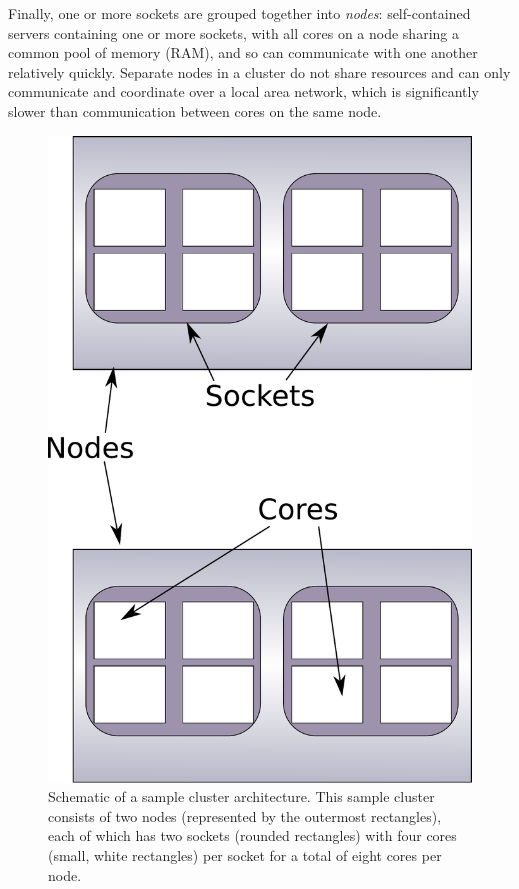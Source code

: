\documentclass{report}
\begin{document}
Finally, one or more sockets are grouped together into \textit{nodes}: self-contained servers containing
one or more sockets, with all cores on a node sharing a common pool of memory (RAM), and so can
communicate with one another relatively quickly. Separate nodes in a cluster do not share resources and 
can only communicate and coordinate over a local area network, which is significantly slower than
communication between cores on the same node. 

\begin{figure}
\label{fig:cluster_hierarchy}
\centering
\includegraphics[height = 0.5\textheight]{cluster_hierarchy.pdf}
\caption{Schematic of a sample cluster architecture. This sample cluster consists of two nodes
(represented by the outermost rectangles), each of which has two sockets (rounded rectangles) with four
cores (small, white rectangles) per socket for a total of eight cores per node.}
\end{figure}
\end{document}
